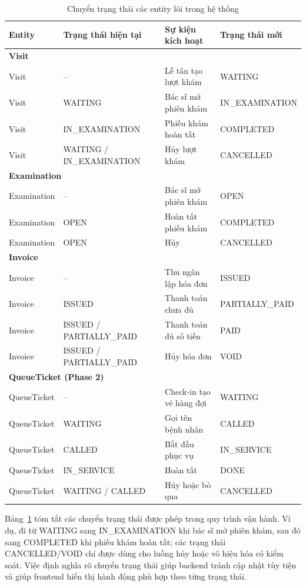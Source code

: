 \begin{longtable}{|p{2.6cm}|p{3.5cm}|p{4.8cm}|p{3.4cm}|}
\caption{Chuyển trạng thái các entity lõi trong hệ thống}\label{tab:state-transitions}\\
\hline
\textbf{Entity} & \textbf{Trạng thái hiện tại} & \textbf{Sự kiện kích hoạt} & \textbf{Trạng thái mới} \\
\hline
\multicolumn{4}{|l|}{\textbf{Visit}} \\
\hline
Visit & -- & Lễ tân tạo lượt khám & WAITING \\
\hline
Visit & WAITING & Bác sĩ mở phiên khám & IN\_EXAMINATION \\
\hline
Visit & IN\_EXAMINATION & Phiếu khám hoàn tất & COMPLETED \\
\hline
Visit & WAITING / IN\_EXAMINATION & Hủy lượt khám & CANCELLED \\
\hline
\multicolumn{4}{|l|}{\textbf{Examination}} \\
\hline
Examination & -- & Bác sĩ mở phiên khám & OPEN \\
\hline
Examination & OPEN & Hoàn tất phiếu khám & COMPLETED \\
\hline
Examination & OPEN & Hủy & CANCELLED \\
\hline
\multicolumn{4}{|l|}{\textbf{Invoice}} \\
\hline
Invoice & -- & Thu ngân lập hóa đơn & ISSUED \\
\hline
Invoice & ISSUED & Thanh toán chưa đủ & PARTIALLY\_PAID \\
\hline
Invoice & ISSUED / PARTIALLY\_PAID & Thanh toán đủ số tiền & PAID \\
\hline
Invoice & ISSUED / PARTIALLY\_PAID & Hủy hóa đơn & VOID \\
\hline
\multicolumn{4}{|l|}{\textbf{QueueTicket (Phase 2)}} \\
\hline
QueueTicket & -- & Check-in tạo vé hàng đợi & WAITING \\
\hline
QueueTicket & WAITING & Gọi tên bệnh nhân & CALLED \\
\hline
QueueTicket & CALLED & Bắt đầu phục vụ & IN\_SERVICE \\
\hline
QueueTicket & IN\_SERVICE & Hoàn tất & DONE \\
\hline
QueueTicket & WAITING / CALLED & Hủy hoặc bỏ qua & CANCELLED \\
\hline
\end{longtable}

Bảng~\ref{tab:state-transitions} tóm tắt các chuyển trạng thái được phép trong quy trình vận hành. Ví dụ,  đi từ WAITING sang IN\_EXAMINATION khi bác sĩ mở phiên khám, sau đó sang COMPLETED khi phiếu khám hoàn tất; các trạng thái CANCELLED/VOID chỉ được dùng cho luồng hủy hoặc vô hiệu hóa có kiểm soát. Việc định nghĩa rõ chuyển trạng thái giúp backend tránh cập nhật tùy tiện và giúp frontend hiển thị hành động phù hợp theo từng trạng thái.

